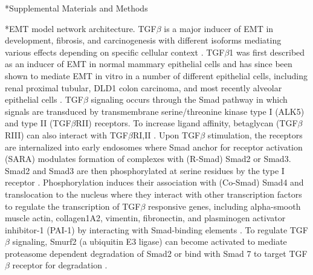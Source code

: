\documentclass[12pt]{article}
\makeatletter
\renewcommand\subsection{\@startsection
	{subsection}{2}{0mm}
	{-0.05in}
	{-0.5\baselineskip}
	{\normalfont\normalsize\bfseries}}
\renewcommand\section{\@startsection
	{subsection}{2}{0mm}
	{-0.2in}
	{0.05\baselineskip}
	{\normalfont\large\bfseries}}
\makeatother
\begin{document}
\section*{Supplemental Materials and Methods}
\subsection*{EMT model network architecture.} TGF$\beta$ is a major inducer of EMT in development, fibrosis, and carcinogenesis with different isoforms mediating various effects depending on specific cellular context \cite{Nawshad:2005pi}.
TGF$\beta$1 was first described as an inducer of EMT in normal mammary epithelial cells \cite{Miettinen1994} and has since been shown to mediate EMT in vitro in a number of different epithelial cells, including renal proximal tubular, DLD1 colon carcinoma, and most recently alveolar epithelial cells \cite{Fan1999, Hales1994,Kasai2005,Willis2005}.
TGF$\beta$ signaling occurs through the Smad pathway in which signals are transduced by transmembrane serine/threonine kinase type I (ALK5) and type II (TGF$\beta$RII) receptors.
To increase ligand affinity, betaglycan (TGF$\beta$RIII) can also interact with TGF$\beta$RI,II \cite{Gatza:2010if}.
Upon TGF$\beta$ stimulation, the receptors are internalized into early endosomes where Smad anchor for receptor activation (SARA) modulates formation of complexes with (R-Smad) Smad2 or Smad3.
Smad2 and Smad3 are then phosphorylated at serine residues by the type I receptor \cite{Massague:2005qc}.
Phosphorylation induces their association with (Co-Smad) Smad4 and translocation to the nucleus where they interact with other transcription factors to regulate the transcription of TGF$\beta$ responsive genes, including alpha-smooth muscle actin, collagen1A2, vimentin, fibronectin, and plasminogen activator inhibitor-1 (PAI-1) by interacting with Smad-binding elements \cite{Dennler:2002hl,Derynck:2003fc}.
To regulate TGF$\beta$ signaling, Smurf2 (a ubiquitin E3 ligase) can become activated to mediate proteasome dependent degradation of Smad2 or bind with Smad 7 to target TGF$\beta$ receptor for degradation \cite{Kavsak2000,Bonni2001}.
\end{document}
